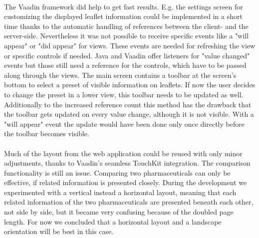 \\
The Vaadin framework did help to get fast results. E.g. the settings screen for customizing the displayed leaflet information could be implemented in a short time thanks to the automatic handling of references between the client- and the server-side. Nevertheless it was not possible to receive specific events like a "will appear" or "did appear" for views. These events are needed for refreshing the view or specific controls if needed. Java and Vaadin offer listeners for "value changed" events but those still need a reference for the controls, which have to be passed along through the views. The main screen contains a toolbar at the screen's bottom to select a preset of visible information on leaflets. If now the user decides to change the preset in a lower view, this toolbar needs to be updated as well. Additionally to the increased reference count this method has the drawback that the toolbar gets updated on every value change, although it is not visible. With a "will appear" event the update would have been done only once directly before the toolbar becomes visible.
\\
\\
Much of the layout from the web application could be reused with only minor adjustments, thanks to Vaadin's seamless TouchKit integration. The comparison functionality is still an issue. Comparing two pharmaceuticals can only be effective, if related information is presented closely. During the development we experimented with a vertical instead a horizontal layout, meaning that each related information of the two pharmaceuticals are presented beneath each other, not side by side, but it became very confusing because of the doubled page length. For now we concluded that a horizontal layout and a landscape orientation will be best in this case.


